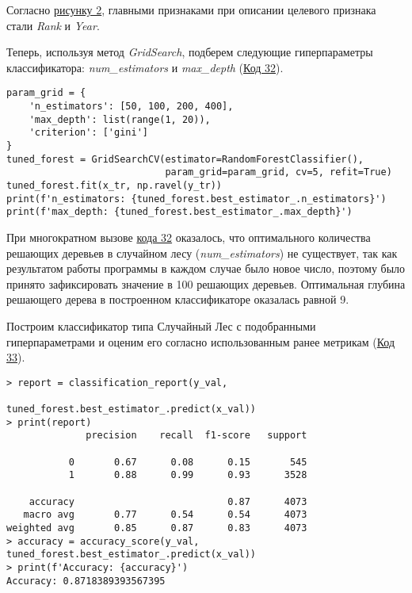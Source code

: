 Согласно \hyperref[image:2]{рисунку 2}, главными признаками при описании целевого признака стали \textit{Rank} и \textit{Year}.

Теперь, используя метод \textit{GridSearch}, подберем следующие гиперпараметры классификатора: \textit{num\_estimators} и \textit{max\_depth} (\hyperref[code:32]{Код 32}).

\begin{code}
\begin{verbatim}
param_grid = {
    'n_estimators': [50, 100, 200, 400],
    'max_depth': list(range(1, 20)),
    'criterion': ['gini']
}
tuned_forest = GridSearchCV(estimator=RandomForestClassifier(), 
                            param_grid=param_grid, cv=5, refit=True)
tuned_forest.fit(x_tr, np.ravel(y_tr))
print(f'n_estimators: {tuned_forest.best_estimator_.n_estimators}')
print(f'max_depth: {tuned_forest.best_estimator_.max_depth}')
\end{verbatim}
\label{code:32}
\end{code}

При многократном вызове \hyperref[code:32]{кода 32} оказалось, что оптимального количества решающих деревьев в случайном лесу (\textit{num\_estimators}) не существует, так как результатом работы программы в каждом случае было новое число, поэтому было принято зафиксировать значение в 100 решающих деревьев. Оптимальная глубина решающего дерева в построенном классификаторе оказалась равной 9.

Построим классификатор типа Случайный Лес с подобранными гиперпараметрами и оценим его согласно использованным ранее метрикам (\hyperref[code:33]{Код 33}).

\begin{code}
\begin{verbatim}
> report = classification_report(y_val,
                               tuned_forest.best_estimator_.predict(x_val))
> print(report)
              precision    recall  f1-score   support

           0       0.67      0.08      0.15       545
           1       0.88      0.99      0.93      3528

    accuracy                           0.87      4073
   macro avg       0.77      0.54      0.54      4073
weighted avg       0.85      0.87      0.83      4073
> accuracy = accuracy_score(y_val, tuned_forest.best_estimator_.predict(x_val))
> print(f'Accuracy: {accuracy}')
Accuracy: 0.8718389393567395
\end{verbatim}
\label{code:33}
\end{code}

